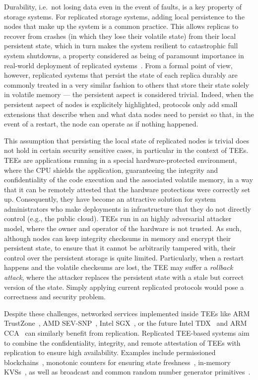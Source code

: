Durability, i.e.\ not losing data even in the event of faults, is a key property of storage
systems. For replicated storage systems, adding local persistence
to the nodes that make up the system is a common practice. This
allows replicas to recover from crashes (in which they lose their
volatile state) from their local persistent state, which in turn makes the
system resilient to catastrophic full system
shutdowns, a property considered as being of paramount importance
in real-world deployment of replicated systems~\cite{bolosky:paxos}. From a
formal point of view, however, replicated systems that persist
the state of each replica durably are commonly treated in a
very similar fashion to others that store their state solely in
volatile memory --- the persistent aspect is considered trivial.
Indeed, when the persistent aspect of nodes is explicitely
highlighted, protocols only add small extensions that describe
when and what data nodes need to persist so that, in the event of
a restart, the node can operate as if nothing happened.

This assumption that persisting the local state of
replicated nodes is trivial does not hold in certain security sensitive cases, in
particular in the context of \acp{TEE}. \acp{TEE} are
applications running in a special hardware-protected environment,
where the CPU shields the application, guaranteeing the integrity
and confidentiality of the code execution and the associated
volatile memory, in a way that it can be remotely attested that
the hardware protections were correctly set up. Consequently, they
have become an attractive solution for system administrators who
make deployments in infrastructure that they do not directly
control (e.g., the public cloud). \acp{TEE} run in an highly
adversarial attacker model, where the owner and operator of the
hardware is not trusted. As such, although nodes can keep
integrity checksums in memory and encrypt their persistent state,
to ensure that it cannot be arbitrarily tampered with, their
control over the persistent storage is quite limited.
Particularly, when a restart happens and the volatile checksums
are lost, the \ac{TEE} may suffer a \emph{rollback attack}, where
the attacker replaces the persistent state with a stale but
correct version of the state. Simply applying current replicated
protocols would pose a correctness and security problem.

Despite these challenges, networked services implemented inside \acp{TEE} like
ARM TrustZone~\cite{armTZ}, AMD SEV-SNP~\cite{amdsev,
amdsev-snp}, Intel SGX~\cite{intelsgx}, or the future Intel
TDX~\cite{inteltdx} and ARM CCA~\cite{arm-cca} can similarly
benefit from replication.  Replicated \ac{TEE}-based systems aim
to combine the confidentiality, integrity, and remote attestation
of \acp{TEE} with replication to ensure high availability.
Examples include permissioned blockchains~\cite{teechain},
monotonic counters for ensuring state freshness~\cite{rote},
in-memory \acp{KVS}~\cite{avocado-atc21}, as well as
broadcast and common random number generator
primitives~\cite{p2p-sgx}.

